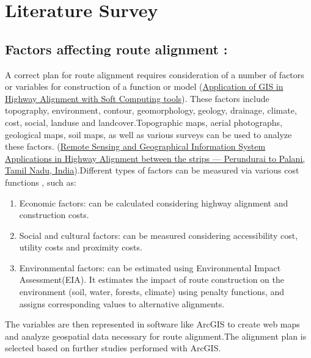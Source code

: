 \section{Literature Survey}
\subsection{Factors affecting route alignment : }
A correct plan for route alignment requires consideration of a number of factors or variables for construction of a function or model (\href{ https://ieeexplore.ieee.org/document/6675923}{Application of GIS in Highway Alignment with Soft Computing tools}). These factors include topography, environment, contour, geomorphology, geology, drainage, climate, cost, social, landuse and landcover.Topographic maps, aerial photographs, geological maps, soil maps, as well as various surveys can be used to analyze these factors. (\href{https://ieeexplore.ieee.org/document/8068706}{Remote Sensing and Geographical Information System Applications in Highway Alignment between the strips — Perundurai to Palani, Tamil Nadu, India}).Different types of factors can be measured via various cost functions , such as:
\begin{enumerate}
    \item Economic factors: can be calculated considering highway alignment and construction costs.
    \item Social and cultural factors: can be measured  considering accessibility cost, utility costs and proximity costs.
    \item  Environmental factors: can be estimated using Environmental Impact Assessment(EIA). It estimates the impact of route construction on the environment (soil, water, forests, climate) using penalty functions, and assigns corresponding values to alternative alignments.
\end{enumerate}

The variables are then represented in software like ArcGIS to create web maps and analyze geospatial data necessary for route alignment.The alignment plan is selected based on further studies performed with ArcGIS.
